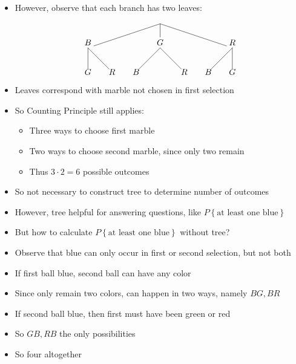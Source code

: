 \documentclass{beamer}
\theoremstyle{definition}
\begin{document}
\begin{frame}
\begin{itemize}
\item However, observe that each branch has
\alert{two} leaves:
\[\begin{xy}<1cm,0cm>:
(0,0)="0";
(-3,-1)="-31";
(0,-1)="01";
(3,-1)="31";
"0";"-31"*+!D{B}**\dir{-};
"0";"01"*+!D{G}**\dir{-};
"0";"31"*+!D{R}**\dir{-};
"-31";(-3,-2)*{G}**\dir{-};
"-31";(-2,-2)*{R}**\dir{-};
"01";(-1,-2)*{B}**\dir{-};
"01";(1,-2)*{R}**\dir{-};
"31";(2,-2)*{B}**\dir{-};
"31";(3,-2)*{G}**\dir{-};
\end{xy}\]
\item Leaves correspond with marble \alert{not chosen}
in first selection
\item So Counting Principle still applies:
\begin{itemize}
\item Three ways to choose first marble
\item \alert{Two} ways to choose second marble, since only two remain
\item Thus $3\cdot 2=6$ possible outcomes
\end{itemize}
\item So not necessary to construct tree to determine
number of outcomes
\item However, tree helpful for answering questions, like
$P\left\{\text{at least one blue}\right\}$
\end{itemize}
\end{frame}

\begin{frame}
\begin{itemize}
\item But how to calculate
$P\left\{\text{at least one blue}\right\}$
without tree?
\item Observe that blue can only occur in first
or second selection, but not both
\item If first ball blue, second ball can have any color
\item Since only remain two colors, can happen in two ways,
namely $BG,BR$
\item If second ball blue, then first must have been green or red
\item So $GB,RB$ the only possibilities
\item So four altogether
\end{itemize}
\end{frame}
\end{document}
